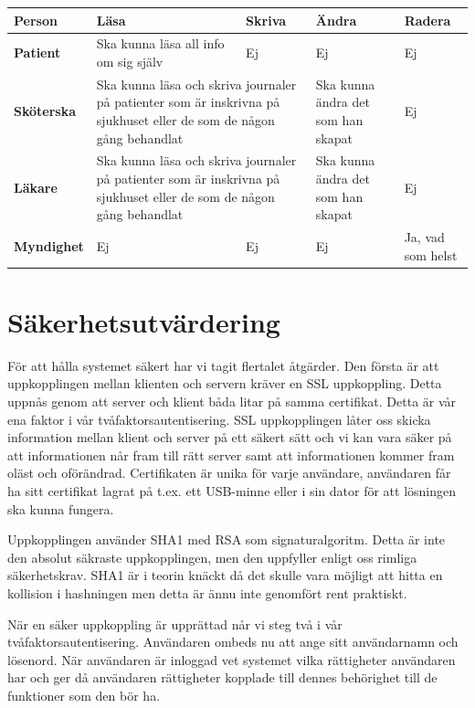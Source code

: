 \documentclass[a4paper]{article}
\begin{document}
\begin{tabularx}{\textwidth}{|l|X| X | X | X |}
\hline
\textbf{Person} & \textbf{Läsa} & \textbf{Skriva} & \textbf{Ändra} & \textbf{Radera} \\
\hline

\textbf{Patient} & Ska kunna läsa all info om sig själv & Ej & Ej & Ej \\
\hline

\textbf{Sköterska} & \multicolumn{2}{p{5.0cm}|}{Ska kunna läsa och skriva journaler på patienter som är inskrivna på sjukhuset eller de som de någon gång behandlat} & Ska kunna ändra det som han skapat & Ej \\
\hline

\textbf{Läkare} & \multicolumn{2}{p{5.0cm}|}{Ska kunna läsa och skriva journaler på patienter som är inskrivna på sjukhuset eller de som de någon gång behandlat} & Ska kunna ändra det som han skapat & Ej \\
\hline

\textbf{Myndighet} & Ej & Ej & Ej & Ja, vad som helst \\
\hline

\end{tabularx}

\section{Säkerhetsutvärdering}

För att hålla systemet säkert har vi tagit flertalet åtgärder. Den första är att uppkopplingen mellan klienten och servern kräver en SSL uppkoppling. Detta uppnås genom att server och klient båda litar på samma certifikat. Detta är vår ena faktor i vår tvåfaktorsautentisering. SSL uppkopplingen låter oss skicka information mellan klient och server på ett säkert sätt och vi kan vara säker på att informationen når fram till rätt server samt att informationen kommer fram oläst och oförändrad. Certifikaten är unika för varje användare, användaren får ha sitt certifikat lagrat på t.ex. ett USB-minne eller i sin dator för att lösningen ska kunna fungera. 

Uppkopplingen använder SHA1 med RSA som signaturalgoritm. Detta är inte den absolut säkraste uppkopplingen, men den uppfyller enligt oss rimliga säkerhetskrav. SHA1 är i teorin knäckt då det skulle vara möjligt att hitta en kollision i hashningen men detta är ännu inte genomfört rent praktiskt.

När en säker uppkoppling är upprättad når vi steg två i vår tvåfaktorsautentisering. Användaren ombeds nu att ange sitt användarnamn och lösenord. 
När användaren är inloggad vet systemet vilka rättigheter användaren har och ger då användaren rättigheter kopplade till dennes behörighet till de funktioner som den bör ha.
\end{document}
